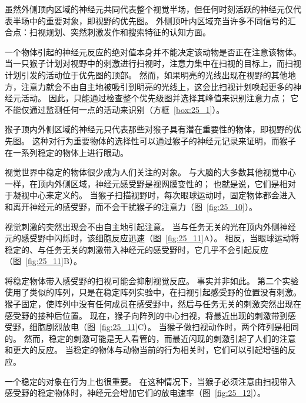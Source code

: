 虽然外侧顶内区域的神经元共同代表整个视觉半场，但任何时刻活跃的神经元仅代表半场中的重要对象，即视野的优先图。
外侧顶叶内区域充当许多不同信号的汇合点：扫视规划、突然刺激发作和搜索特征的认知方面。


一个物体引起的神经元反应的绝对值本身并不能决定该动物是否正在注意该物体。
当一只猴子计划对视野中的刺激进行扫视时，注意力集中在扫视的目标上，而扫视计划引发的活动位于优先图的顶部。
然而，如果明亮的光线出现在视野的其他地方，注意力就会不由自主地被吸引到明亮的光线上，这会比扫视计划唤起更多的神经元活动。
因此，只能通过检查整个优先级图并选择其峰值来识别注意力点；
它不能仅通过监测任何一点的活动来识别（方框~\ref{box:25_1}）。


\begin{proposition}[顶叶皮层的优先级图] \label{box:25_1}
	
	\quad \quad 猴子顶内外侧区域的神经元只代表那些对猴子具有潜在重要性的物体，即视野的优先图。
	这种对行为重要物体的选择性可以通过猴子的神经元记录来证明，而猴子在一系列稳定的物体上进行眼动。
	
	\quad \quad 视觉世界中稳定的物体很少成为人们关注的对象。
	与大脑的大多数其他视觉中心一样，在顶内外侧区域，神经元感受野是视网膜变性的；
	也就是说，它们是相对于凝视中心来定义的。
	当猴子扫描视野时，每次眼球运动时，固定物体都会进入和离开神经元的感受野，而不会干扰猴子的注意力（图~\ref{fig:25_10}）。
	
	\quad \quad 视觉刺激的突然出现会不由自主地引起注意。
	当与任务无关的光在顶内外侧神经元的感受野中闪烁时，该细胞反应迅速（图~\ref{fig:25_11}A）。
	相反，当眼球运动将稳定的、与任务无关的刺激带入神经元的感受野时，它几乎不会引起反应（图~\ref{fig:25_11}B）。
	
	\quad \quad 将稳定物体带入感受野的扫视可能会抑制视觉反应。
	事实并非如此。
	第二个实验使用了类似的阵列，只是在稳定阵列实验中，在扫视引起感受野的位置没有刺激。
	猴子固定，使阵列中没有任何成员在感受野中，然后与任务无关的刺激突然出现在感受野的接种后位置。
	现在，猴子向阵列的中心扫视，将最近出现的刺激带到感受野，细胞剧烈放电（图~\ref{fig:25_11}C）。
	当猴子做扫视动作时，两个阵列是相同的。
	然而，稳定的刺激可能是无人看管的，而最近闪现的刺激引起了人们的注意和更大的反应。
	当稳定的物体与动物当前的行为相关时，它们可以引起增强的反应。
	
	\quad \quad 一个稳定的对象在行为上也很重要。
	在这种情况下，当猴子必须注意由扫视带入感受野的稳定物体时，神经元会增加它们的放电速率（图~\ref{fig:25_12}）。
	
\end{proposition}


